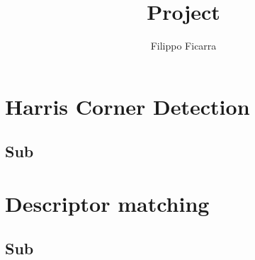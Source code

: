 \documentclass[a4paper,11pt]{article}
\title{Project}
\author{Filippo Ficarra}
\begin{document}
\maketitle


\renewcommand{\contentsname}{Summary}

\tableofcontents

\newpage
{}

\section{Harris Corner Detection}
\subsection{Sub}

\section{Descriptor matching}
\subsection{Sub}
\end{document}
